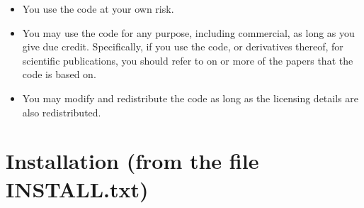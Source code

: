 \documentclass{article}
\begin{document}
\begin{itemize}
\item You use the code at your own risk.
\item You may use the code for any purpose, including commercial, as
long as you give due credit. Specifically, if you use the code, or
derivatives thereof, for scientific publications, you should refer
to on or more of the papers
\citet{Borlin2013:Bundle,Borlin2013:Experiments,Borlin2014:Camera,Borlin2016:External,Borlin2018:Modular,Borlin2019:Implementing,Borlin2019:Flexible}
that the code is based on.
\item You may modify and redistribute the code as long as the
licensing details are also redistributed.
\end{itemize}

\newpage
\section[Installation]{Installation (from the file INSTALL.txt)}
\label{sec:install}
\end{document}
